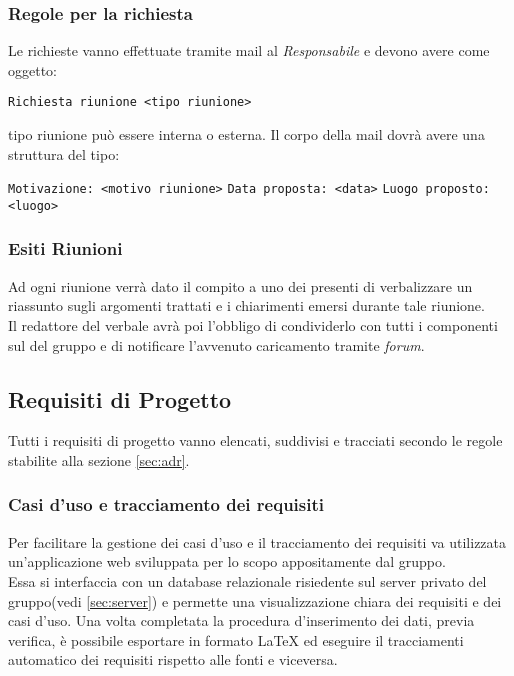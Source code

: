 \documentclass{scalatekids-article}
\begin{document}
\subsubsection{Regole per la richiesta}
\label{sec:RegoleRichiesta}
Le richieste vanno effettuate tramite mail al \textit{Responsabile} e devono avere come oggetto:
\begin{center}
  \verb=Richiesta riunione <tipo riunione>=
\end{center}
tipo riunione può essere interna o esterna.
Il corpo della mail dovrà avere una struttura del tipo:
\begin{center}
  \verb=Motivazione: <motivo riunione>=
  \verb=Data proposta: <data>=
  \verb=Luogo proposto: <luogo>=
\end{center}

\subsubsection{Esiti Riunioni}
Ad ogni riunione verrà dato il compito a uno dei presenti di verbalizzare un riassunto sugli argomenti trattati e i chiarimenti emersi durante tale riunione.\\
Il redattore del verbale avrà poi l'obbligo di condividerlo con tutti i componenti sul \textit{} del gruppo e di notificare l'avvenuto caricamento tramite \textit{forum}.

\subsection{Requisiti di Progetto}
Tutti i requisiti di progetto vanno elencati, suddivisi e tracciati secondo le regole stabilite alla sezione \ref{sec:adr}.
\subsubsection{Casi d'uso e tracciamento dei requisiti}
\label{sec:frontend}
Per facilitare la gestione dei casi d'uso e il tracciamento dei requisiti
va utilizzata un'applicazione web sviluppata per lo scopo appositamente dal
gruppo.\\Essa si interfaccia con un database relazionale risiedente sul server
privato del gruppo(vedi \ref{sec:server}) e permette una visualizzazione chiara dei
requisiti e dei casi d'uso. Una volta completata la procedura d'inserimento dei
dati, previa verifica, è possibile esportare in formato
\LaTeX\xspace ed eseguire il tracciamenti automatico dei requisiti rispetto alle
fonti e viceversa.
\end{document}
